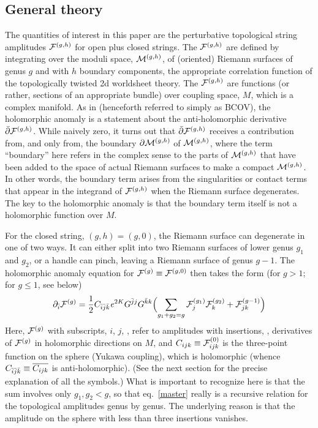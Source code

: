 \subsection{General theory}

The quantities of interest in this paper are the perturbative topological 
string amplitudes ${{\cal F}}^{(g,h)}$ for open plus closed strings. The ${{\cal F}}^{(g,h)}$ are 
defined by integrating over the moduli space, ${\cal M}^{(g,h)}$, of (oriented) 
Riemann surfaces of genus $g$ and with 
$h$ boundary components, the appropriate correlation function of 
the topologically twisted 2d worldsheet theory. The ${{\cal F}}^{(g,h)}$ are 
functions (or rather, sections of an appropriate bundle) over coupling 
space, $M$, which is a complex manifold. As in \cite{bcov2} (henceforth 
referred to simply as BCOV), the holomorphic anomaly is a statement 
about the anti-holomorphic derivative $\bar\partial {{\cal F}}^{(g,h)}$. While naively 
zero, it turns out that $\bar\partial {{\cal F}}^{(g,h)}$ receives a contribution from, 
and only from, the boundary $\partial{\cal M}^{(g,h)}$ of ${\cal M}^{(g,h)}$, where the term 
``boundary'' here refers in the complex sense to the parts of ${\cal M}^{(g,h)}$ 
that have been added to the space of actual Riemann surfaces to make a 
compact ${\cal M}^{(g,h)}$. In other words, the boundary term arises from the 
singularities or contact terms that appear in the integrand of
${{\cal F}}^{(g,h)}$ when the Riemann surface degenerates. The key to the 
holomorphic anomaly is that the boundary term itself is not a 
holomorphic function over $M$. 

For the closed string, $(g,h)=(g,0)$, the Riemann surface can degenerate
in one of two ways. It can either split into two Riemann surfaces of 
lower genus $g_1$ and $g_2$, or a handle can pinch, leaving a Riemann 
surface of genus $g-1$. The holomorphic anomaly equation for ${{\cal F}}^{(g)}\equiv
{{\cal F}}^{(g,0)}$ then takes the form (for $g>1$; for $g\le 1$, see below)
\begin{equation}
\eqlabel{master}
\del_\ib \Fc g = \frac 12 C_{\ib \jb\kb} \ee^{2K} G^{\jb j} G^{\kb k}
\Bigl(\sum_{g_1+g_2=g} \Fc {g_1}_j \Fc {g_2}_k + \Fc {g-1}_{jk} \Bigr)
\end{equation}
Here, ${{\cal F}}^{(g)}$ with subscripts, $i$, $j$, \etc, refer to amplitudes with
insertions, \ie, derivatives of ${{\cal F}}^{(g)}$ in holomorphic directions on $M$,
and $C_{ijk}\equiv {{\cal F}}^{(0)}_{ijk}$ is the three-point function on the sphere 
(Yukawa coupling), which is holomorphic (whence $C_{{\bar i}{\bar j}{\bar k}}\equiv
\overline{C_{ijk}}$ is anti-holomorphic). (See the next section for the 
precise explanation of all 
the symbols.) What is important to recognize here is that the sum involves
only $g_1,g_2<g$, so that eq.\ \eqref{master} really is a recursive relation 
for the topological amplitudes genus by genus. The underlying reason is that 
the amplitude on the sphere with less than three insertions vanishes.


